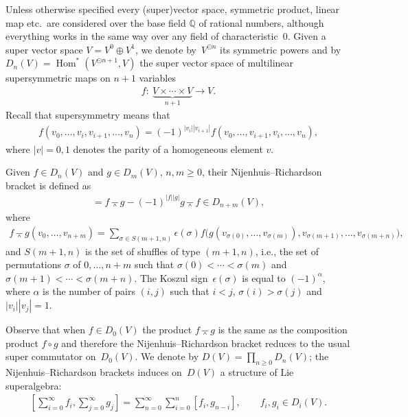 \documentclass[11pt]{article}
\newcommand{\wedgebar}{\barwedge}
\newcommand{\Hom}{\operatorname{Hom}}
\newcommand{\Q}{\mathbb{Q}}
\numberwithin{equation}{section}
\begin{document}
Unless otherwise specif\/ied every (super)vector space, symmetric product, linear map etc.\ are considered over the base f\/ield $\Q$ of rational numbers, although everything works in the same way over any f\/ield of characteristic~0.
Given a super vector space $V=V^{0}\oplus V^{1}$, we denote by~$V^{\odot n}$ its symmetric powers and by
$D_{n}(V)=\Hom^*(V^{\odot n+1},V)$ the super vector space of multilinear supersymmetric maps on $n+1$ variables
\begin{gather*} f\colon \ \underbrace{V\times\cdots\times V}_{n+1}\to V. \end{gather*}
Recall that supersymmetry means that
\begin{gather*} f(v_0,\ldots,v_i,v_{i+1},\ldots,v_n)=(-1)^{|v_i||v_{i+1}|}f(v_0,\ldots,v_{i+1},v_{i},\ldots,v_n),\end{gather*}
where $|v|=0,1$ denotes the parity of a homogeneous element $v$.

Given $f\in D_n(V)$ and $g\in D_m(V)$, $n,m\ge 0$, their Nijenhuis--Richardson bracket \cite{NijRich67} is def\/ined as
\begin{gather*} [f,g]=f\wedgebar g-(-1)^{|f||g|}g\wedgebar f \in D_{n+m}(V),\end{gather*}
where
\begin{gather*} f\wedgebar g
(v_{0},\ldots, v_{n+m})= \sum_{\sigma\in S(m+1,n)}\epsilon(\sigma)
f\big(g(v_{\sigma(0)},\ldots, v_{\sigma(m)}), v_{\sigma(m+1)},\ldots,
v_{\sigma(m+n)}\big),\end{gather*}
and $S(m+1,n)$ is the set of shuf\/f\/les of type $(m+1,n)$, i.e., the set of permutations $\sigma$ of $0,\ldots,n+m$
such that $\sigma(0)<\cdots<\sigma(m)$ and $\sigma(m+1)<\cdots<\sigma(m+n)$. The Koszul sign~$\epsilon(\sigma)$ is equal to $(-1)^{\alpha}$, where $\alpha$ is the number of pairs $(i,j)$ such that $i<j$, $\sigma(i)>\sigma(j)$ and $|v_i||v_j|=1$.

Observe that when $f\in D_0(V)$ the product $f\wedgebar g$ is the same as the composition product $f\circ g$ and therefore
the Nijenhuis--Richardson bracket reduces to the usual super commutator on~$D_0(V)$. We denote by $D(V)=\prod\limits_{n\ge 0}D_n(V)$; the Nijenhuis--Richardson brackets induces on~$D(V)$ a structure of Lie superalgebra:
\begin{gather*} \left[\sum_{i=0}^{\infty}f_i ,\sum_{j= 0}^{\infty}g_j\right]=\sum_{n= 0}^{\infty} \sum_{i=0}^n [f_i,g_{n-i}],\qquad f_i,g_i\in D_i(V) .\end{gather*}
\end{document}

